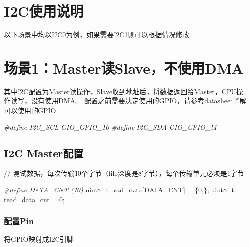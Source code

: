 \documentclass[
  12pt,
]{book}
\newenvironment{Shaded}{\begin{snugshade}}{\end{snugshade}}
\newcommand{\DataTypeTok}[1]{\textcolor[rgb]{0.13,0.29,0.53}{#1}}
\newcommand{\DecValTok}[1]{\textcolor[rgb]{0.00,0.00,0.81}{#1}}
\newcommand{\NormalTok}[1]{#1}
\newcommand{\PreprocessorTok}[1]{\textcolor[rgb]{0.56,0.35,0.01}{\textit{#1}}}
\begin{document}
\hypertarget{i2cux4f7fux7528ux8bf4ux660e}{%
\section{I2C使用说明}\label{i2cux4f7fux7528ux8bf4ux660e}}

以下场景中均以I2C0为例，如果需要I2C1则可以根据情况修改

\hypertarget{ux573aux666f1masterux8bfbslaveux4e0dux4f7fux7528dma}{%
\section{场景1：Master读Slave，不使用DMA}\label{ux573aux666f1masterux8bfbslaveux4e0dux4f7fux7528dma}}

其中I2C配置为Master读操作，Slave收到地址后，将数据返回给Master，CPU操作读写，没有使用DMA。 配置之前需要决定使用的GPIO，请参考datasheet了解可以使用的GPIO

\begin{Shaded}
\begin{Highlighting}[]
\PreprocessorTok{#define I2C_SCL         GIO_GPIO_10}
\PreprocessorTok{#define I2C_SDA         GIO_GPIO_11}
\end{Highlighting}
\end{Shaded}

\hypertarget{i2c-masterux914dux7f6e}{%
\subsection{I2C Master配置}\label{i2c-masterux914dux7f6e}}

// 测试数据，每次传输10个字节（fifo深度是8字节），每个传输单元必须是1字节

\begin{Shaded}
\begin{Highlighting}[]
\PreprocessorTok{#define DATA_CNT (10)}
\DataTypeTok{uint8_t}\NormalTok{ read_data[DATA_CNT] = \{}\DecValTok{0}\NormalTok{,\};}
\DataTypeTok{uint8_t}\NormalTok{ read_data_cnt = }\DecValTok{0}\NormalTok{;}
\end{Highlighting}
\end{Shaded}

\hypertarget{ux914dux7f6epin}{%
\subsubsection{配置Pin}\label{ux914dux7f6epin}}

将GPIO映射成I2C引脚
\end{document}

